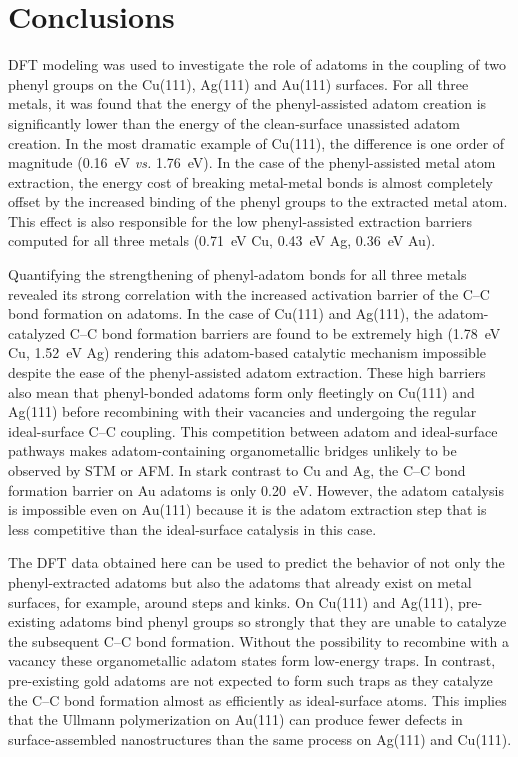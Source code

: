 \documentclass[aps,prb,reprint,amsmath,amssymb]{revtex4-1}
\begin{document}
\section{Conclusions}

DFT modeling was used to investigate the role of adatoms in the coupling of two phenyl groups on the Cu(111), Ag(111) and Au(111) surfaces. For all three metals, it was found that the energy of the phenyl-assisted adatom creation is significantly lower than the energy of the clean-surface unassisted adatom creation. In the most dramatic example of Cu(111), the difference is one order of magnitude (\SI{0.16}{\electronvolt} \emph{vs.} \SI{1.76}{\electronvolt}). In the case of the phenyl-assisted metal atom extraction, the energy cost of breaking metal-metal bonds is almost completely offset by the increased binding of the phenyl groups to the extracted metal atom. This effect is also responsible for the low phenyl-assisted extraction barriers computed for all three metals (\SI{0.71}{\electronvolt} Cu, \SI{0.43}{\electronvolt} Ag, \SI{0.36}{\electronvolt} Au). 

Quantifying the strengthening of phenyl-adatom bonds for all three metals revealed its strong correlation with the increased activation barrier of the C--C bond formation on adatoms. In the case of Cu(111) and Ag(111), the adatom-catalyzed C--C bond formation barriers are found to be extremely high (\SI{1.78}{\electronvolt} Cu, \SI{1.52}{\electronvolt} Ag) rendering this adatom-based catalytic mechanism impossible despite the ease of the phenyl-assisted adatom extraction. These high barriers also mean that phenyl-bonded adatoms form only fleetingly on Cu(111) and Ag(111) before recombining with their vacancies and undergoing the regular ideal-surface C--C coupling. This competition between adatom and ideal-surface pathways makes adatom-containing organometallic bridges unlikely to be observed by STM or AFM. In stark contrast to Cu and Ag, the C--C bond formation barrier on Au adatoms is only \SI{0.20}{\electronvolt}. However, the adatom catalysis is impossible even on Au(111) because it is the adatom extraction step that is less competitive than the ideal-surface catalysis in this case.

The DFT data obtained here can be used to predict the behavior of not only the phenyl-extracted adatoms but also the adatoms that already exist on metal surfaces, for example, around steps and kinks. On Cu(111) and Ag(111), pre-existing adatoms bind phenyl groups so strongly that they are unable to catalyze the subsequent C--C bond formation. Without the possibility to recombine with a vacancy these organometallic adatom states form low-energy traps. In contrast, pre-existing gold adatoms are not expected to form such traps as they catalyze the C--C bond formation almost as efficiently as ideal-surface atoms. This implies that the Ullmann polymerization on Au(111) can produce fewer defects in surface-assembled nanostructures than the same process on Ag(111) and Cu(111).
\end{document}
